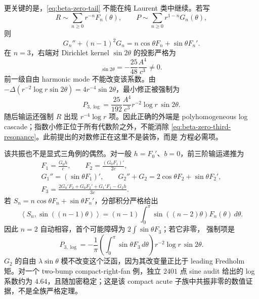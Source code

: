 \documentclass[11pt,a4paper,fontset=fandol]{ctexart}
\begin{document}
更关键的是，\eqref{eq:beta-zero-tail} 不能在纯 Laurent 类中继续。若写
\begin{equation}
  R\sim\sum_{n\ge0}r^{-n}F_n(\theta),\qquad
  P\sim\sum_{n\ge0}r^{1-n}G_n(\theta),
\end{equation}
则
\begin{equation}
  G_n''+(n-1)^2G_n
  =n\cos\theta F_n+\sin\theta F_n'.
\end{equation}
在 $n=3$，右端对 Dirichlet kernel $\sin2\theta$ 的投影严格为
\begin{equation}
  [S_3]_{\sin2\theta}
  =-\frac{25}{48}\frac{A^4}{c^3}\ne0.
  \label{eq:beta-zero-third-resonance}
\end{equation}
前一级自由 harmonic mode 不能改变该系数。由
$-\Delta(r^{-2}\log r\sin2\theta)=4r^{-4}\sin2\theta$，最小修正被强制为
\begin{equation}
  \boxed{P_{3,\log}
  =\frac{25}{192}\frac{A^4}{c^3}
  r^{-2}\log r\,\sin2\theta.}
  \label{eq:beta-zero-forced-log}
\end{equation}
随后输运还强制 $R$ 出现 $r^{-4}\log r$ 项。因此正确的外端是
polyhomogeneous log cascade；指数小修正位于所有代数阶之外，不能消除
\eqref{eq:beta-zero-third-resonance}。此前提出的对数修正在这里不是装饰，而是
方程必需项。

该共振也不是显式三角例的偶然。对一般 $h=F_0'$、$b=0$，前三阶输运递推为
\begin{gather}
 F_1=\frac{G_0h}{c},\qquad
 F_2=\frac{(G_0F_1)'}{2c},\\
 G_1''=(\sin\theta F_1)',\qquad
 G_2''+G_2=2\cos\theta F_2+\sin\theta F_2',\\
 F_3=\frac{2G_0'F_2+G_0F_2'+G_1'F_1-G_2h}{3c}.
 \label{eq:beta-zero-general-recursion}
\end{gather}
若 $S_n=n\cos\theta F_n+\sin\theta F_n'$，分部积分严格给出
\begin{equation}
 \left\langle S_n,\sin((n-1)\theta)\right\rangle
 =(n-1)\int_0^\pi\sin((n-2)\theta)F_n(\theta)\,d\theta.
 \label{eq:beta-zero-resonance-functional}
\end{equation}
因此 $n=2$ 自动相容，首个可能障碍为 $2\int\sin\theta F_3$；若它非零，
强制项是
\begin{equation}
 \boxed{P_{3,\log}=-\frac1\pi
 \left(\int_0^\pi\sin\theta F_3\,d\theta\right)
 r^{-2}\log r\,\sin2\theta.}
 \label{eq:beta-zero-general-log}
\end{equation}
$G_2$ 的自由 $\lambda\sin\theta$ 模不改变这个泛函，因为其改变量正比于
leading Fredholm 矩。对一个 two-bump compact-right-fan 例，独立 $2401$ 点
sine audit 给出的 log 系数约为 $4.64$，且随加密稳定；这是该 compact acute
子族中共振非零的数值证据，不是全族严格定理。
\end{document}
